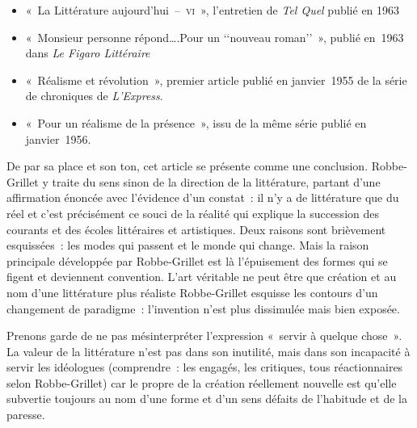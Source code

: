 \documentclass[12pt, a4paper]{article}
\begin{document}
\begin{itemize}

	\item «~La Littérature aujourd'hui~–~\textsc{vi}~», l'entretien de \textit{Tel Quel} publié en 1963

	\item «~Monsieur personne répond….Pour un ‘‘nouveau roman’’~», publié en~1963 dans \textit{Le Figaro Littéraire}

	\item «~Réalisme et révolution~», premier article publié en janvier~1955 de la série de chroniques de \textit{L'Express}.

	\item «~Pour un réalisme de la présence~», issu de la même série publié en janvier~1956.
\end{itemize}
De par sa place et son ton, cet article se présente comme une conclusion. Robbe-Grillet y traite du sens sinon de la direction de la littérature, partant d'une affirmation énoncée avec l'évidence d'un constat~: il n'y a de littérature que du réel et c'est précisément ce souci de la réalité qui explique la succession des courants et des écoles littéraires et artistiques. Deux raisons sont brièvement esquissées~: les modes qui passent et le monde qui change. Mais la raison principale développée par Robbe-Grillet est là l'épuisement des formes qui se figent et deviennent convention. L'art véritable ne peut être que création et au nom d'une littérature plus réaliste Robbe-Grillet esquisse les contours d'un changement de paradigme~: l'invention n'est plus dissimulée mais bien exposée.

Prenons garde de ne pas mésinterpréter l'expression «~servir à quelque chose~». La valeur de la littérature n'est pas dans son inutilité, mais dans son incapacité à servir les idéologues  (comprendre~: les engagés, les critiques, tous réactionnaires selon Robbe-Grillet) car le propre de la création réellement nouvelle est qu'elle subvertie toujours au nom d'une forme et d'un sens défaits de l'habitude et de la paresse.





 

	
\end{document}
